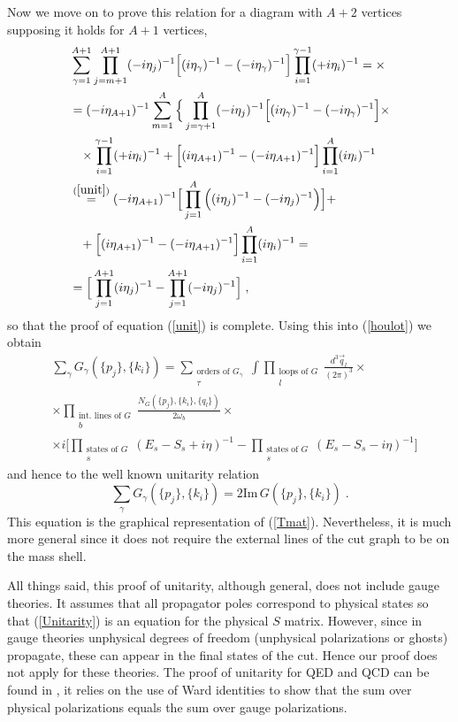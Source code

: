 \documentclass[%
 reprint,
 amsmath,amssymb,
 aps,
]{revtex4-1}
\begin{document}
Now we move on to prove this relation for a diagram with $A+2$ vertices supposing it holds for $A+1$ vertices,
\begin{align}
&\sum_{\gamma=1}^{A+1} \prod_{j=m+1}^{A+1}(-i\eta_j)^{-1}\Big[(i\eta_\gamma)^{-1}-(-i\eta_\gamma)^{-1}\Big]\prod_{i=1}^{\gamma-1}(+i\eta_i)^{-1}=\times\nonumber\\
&=(-i\eta_{A+1})^{-1}\sum_{m=1}^A\Big\{\prod_{j=\gamma+1}^A(-i\eta_j)^{-1}\Big[(i\eta_\gamma)^{-1}-(-i\eta_\gamma)^{-1}\Big]\times\nonumber\\
&\;\;\;\times\prod_{i=1}^{\gamma-1}(+i\eta_i)^{-1}+\Big[(i\eta_{A+1})^{-1}-(-i\eta_{A+1})^{-1}\Big]\prod_{i=1}^{A}(i\eta_i)^{-1}\nonumber\\
&\stackrel{(\ref{unit})}{=}(-i\eta_{A+1})^{-1}\Big[\prod_{j=1}^A\Big((i\eta_j)^{-1}-(-i\eta_j)^{-1}\Big)\Big]+\nonumber\\
&\;\;\;+\Big[(i\eta_{A+1})^{-1}-(-i\eta_{A+1})^{-1}\Big]\prod_{i=1}^{A}(i\eta_i)^{-1}=\nonumber\\
&=\Big[\prod_{j=1}^{A+1}(i\eta_j)^{-1}-\prod_{j=1}^{A+1}(-i\eta_j)^{-1}\Big]\;,
\end{align}
so that the proof of equation (\ref{unit}) is complete. Using this into (\ref{houlot}) we obtain
\begin{align}
&\sum_{\gamma} G_\gamma(\{p_j\},\{k_i\})=\sum_{\substack{\text{orders of $G_\gamma$} \\ \tau}}\int\prod_{\substack{\text{loops of $G$} \\ l}}\frac{d^3\vec{q}_l}{(2\pi)^3}\times\nonumber\\
& \times\prod_{\substack{\text{int. lines of $G$} \\ b}}\frac{N_{G}(\{p_j\},\{k_i\},\{q_l\})}{2\omega_b}\times\nonumber\\
&\times i\Big[\prod_{\substack{\text{states of $G$} \\ s}}(E_s-S_s+i\eta)^{-1}-\prod_{\substack{\text{states of $G$} \\ s}}(E_s-S_s-i\eta)^{-1}\Big]
\end{align}
and hence to the well known unitarity relation
\begin{equation}
\sum_{\gamma} G_\gamma(\{p_j\},\{k_i\})=2\text{Im} \,G(\{p_j\},\{k_i\})\;.\label{Unitarity}
\end{equation}
This equation is the graphical representation of (\ref{Tmat}). Nevertheless, it is much more general since it does not require the external lines of the cut graph to be on the mass shell.\par
All things said, this proof of unitarity, although general, does not include gauge theories. It assumes that all propagator poles correspond to physical states so that (\ref{Unitarity}) is an equation for the physical $S$ matrix. However, since in gauge theories unphysical degrees of freedom (unphysical polarizations or ghosts) propagate, these can appear in the final states of the cut. Hence our proof does not apply for these theories. The proof of unitarity for QED and QCD can be found in \cite{QFTSterman}, it relies on the use of Ward identities to show that the sum over physical polarizations equals the sum over gauge polarizations.
\end{document}
